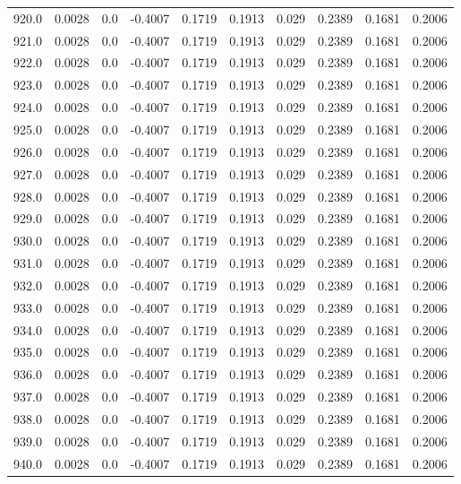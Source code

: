 \begin{longtable}{lrrrrrrrrr}
920.0 & 0.0028 & 0.0 & -0.4007 & 0.1719 & 0.1913 & 0.029 & 0.2389 & 0.1681 & 0.2006 \\
921.0 & 0.0028 & 0.0 & -0.4007 & 0.1719 & 0.1913 & 0.029 & 0.2389 & 0.1681 & 0.2006 \\
922.0 & 0.0028 & 0.0 & -0.4007 & 0.1719 & 0.1913 & 0.029 & 0.2389 & 0.1681 & 0.2006 \\
923.0 & 0.0028 & 0.0 & -0.4007 & 0.1719 & 0.1913 & 0.029 & 0.2389 & 0.1681 & 0.2006 \\
924.0 & 0.0028 & 0.0 & -0.4007 & 0.1719 & 0.1913 & 0.029 & 0.2389 & 0.1681 & 0.2006 \\
925.0 & 0.0028 & 0.0 & -0.4007 & 0.1719 & 0.1913 & 0.029 & 0.2389 & 0.1681 & 0.2006 \\
926.0 & 0.0028 & 0.0 & -0.4007 & 0.1719 & 0.1913 & 0.029 & 0.2389 & 0.1681 & 0.2006 \\
927.0 & 0.0028 & 0.0 & -0.4007 & 0.1719 & 0.1913 & 0.029 & 0.2389 & 0.1681 & 0.2006 \\
928.0 & 0.0028 & 0.0 & -0.4007 & 0.1719 & 0.1913 & 0.029 & 0.2389 & 0.1681 & 0.2006 \\
929.0 & 0.0028 & 0.0 & -0.4007 & 0.1719 & 0.1913 & 0.029 & 0.2389 & 0.1681 & 0.2006 \\
930.0 & 0.0028 & 0.0 & -0.4007 & 0.1719 & 0.1913 & 0.029 & 0.2389 & 0.1681 & 0.2006 \\
931.0 & 0.0028 & 0.0 & -0.4007 & 0.1719 & 0.1913 & 0.029 & 0.2389 & 0.1681 & 0.2006 \\
932.0 & 0.0028 & 0.0 & -0.4007 & 0.1719 & 0.1913 & 0.029 & 0.2389 & 0.1681 & 0.2006 \\
933.0 & 0.0028 & 0.0 & -0.4007 & 0.1719 & 0.1913 & 0.029 & 0.2389 & 0.1681 & 0.2006 \\
934.0 & 0.0028 & 0.0 & -0.4007 & 0.1719 & 0.1913 & 0.029 & 0.2389 & 0.1681 & 0.2006 \\
935.0 & 0.0028 & 0.0 & -0.4007 & 0.1719 & 0.1913 & 0.029 & 0.2389 & 0.1681 & 0.2006 \\
936.0 & 0.0028 & 0.0 & -0.4007 & 0.1719 & 0.1913 & 0.029 & 0.2389 & 0.1681 & 0.2006 \\
937.0 & 0.0028 & 0.0 & -0.4007 & 0.1719 & 0.1913 & 0.029 & 0.2389 & 0.1681 & 0.2006 \\
938.0 & 0.0028 & 0.0 & -0.4007 & 0.1719 & 0.1913 & 0.029 & 0.2389 & 0.1681 & 0.2006 \\
939.0 & 0.0028 & 0.0 & -0.4007 & 0.1719 & 0.1913 & 0.029 & 0.2389 & 0.1681 & 0.2006 \\
940.0 & 0.0028 & 0.0 & -0.4007 & 0.1719 & 0.1913 & 0.029 & 0.2389 & 0.1681 & 0.2006 \\

\end{longtable}
